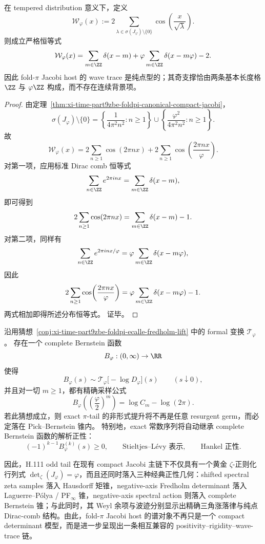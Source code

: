 \begin{proposition}\label{prop:xi-time-part9zbj-pure-point-poisson-jacobi-wave-trace}
在 tempered distribution 意义下，定义
\[
\mathcal W_\varphi(x)
:=
2\sum_{\lambda\in \sigma(J_\varphi)\setminus\{0\}}
\cos\!\left(\frac{x}{\sqrt\lambda}\right).
\]
则成立严格恒等式
\[
\mathcal W_\varphi(x)
=
\sum_{m\in\ZZ}\delta(x-m)
+
\varphi\sum_{m\in\ZZ}\delta(x-m\varphi)
-2.
\]
因此 fold-\(\pi\) Jacobi host 的 wave trace 是纯点型的；其奇支撑恰由两条基本长度格 \(\ZZ\) 与 \(\varphi\ZZ\) 构成，而不存在连续背景项。
\end{proposition}
\begin{proof}
由定理~\ref{thm:xi-time-part9zbe-foldpi-canonical-compact-jacobi}，
\[
\sigma(J_\varphi)\setminus\{0\}
=
\left\{\frac{1}{4\pi^2n^2}:n\ge 1\right\}
\cup
\left\{\frac{\varphi^2}{4\pi^2n^2}:n\ge 1\right\}.
\]
故
\[
\mathcal W_\varphi(x)
=
2\sum_{n\ge 1}\cos(2\pi n x)
+
2\sum_{n\ge 1}\cos\!\left(\frac{2\pi n x}{\varphi}\right).
\]
对第一项，应用标准 Dirac comb 恒等式
\[
\sum_{n\in\ZZ}e^{2\pi i n x}
=
\sum_{m\in\ZZ}\delta(x-m),
\]
即可得到
\[
2\sum_{n\ge 1}\cos(2\pi n x)
=
\sum_{m\in\ZZ}\delta(x-m)-1.
\]
对第二项，同样有
\[
\sum_{n\in\ZZ}e^{2\pi i n x/\varphi}
=
\varphi\sum_{m\in\ZZ}\delta(x-m\varphi),
\]
因此
\[
2\sum_{n\ge 1}\cos\!\left(\frac{2\pi n x}{\varphi}\right)
=
\varphi\sum_{m\in\ZZ}\delta(x-m\varphi)-1.
\]
两式相加即得所述分布恒等式。
证毕。
\end{proof}

\begin{conjecture}\label{conj:xi-time-part9zbj-complete-bernstein-ecalle-fredholm}
沿用猜想~\ref{conj:xi-time-part9zbe-foldpi-ecalle-fredholm-lift} 中的 formal 变换 \(\mathcal T_\varphi\)。
存在一个 complete Bernstein 函数
\[
B_\varphi:(0,\infty)\to \RR
\]
使得
\[
B_\varphi(s)\sim \mathcal T_\varphi\!\bigl[-\log D_\varphi\bigr](s)
\qquad (s\downarrow 0),
\]
并且对一切 \(m\ge 1\)，都有精确采样公式
\[
B_\varphi\!\left(\left(\frac{\varphi}{2}\right)^m\right)
=
\log C_m-\log(2\pi).
\]
若此猜想成立，则 exact \(\pi\)-tail 的非形式提升将不再是任意 resurgent germ，而必定落在 Pick--Bernstein 锥内。
特别地，exact 常数序列将自动继承 complete Bernstein 函数的解析正性：
\[
(-1)^{k-1}B_\varphi^{(k)}(s)\ge 0,
\qquad
\text{Stieltjes--L\'evy 表示},
\qquad
\text{Hankel 正性}.
\]
\end{conjecture}

\noindent
因此，H.111 odd tail 在现有 compact Jacobi 主链下不仅具有一个黄金 \(\zeta\)-正则化行列式 \(\det_\zeta(J_\varphi)=\varphi\)，而且还同时落入三种经典正性几何：shifted spectral zeta samples 落入 Hausdorff 矩锥，negative-axis Fredholm determinant 落入 Laguerre--P\'olya / PF\(_\infty\) 锥，negative-axis spectral action 则落入 complete Bernstein 锥；与此同时，其 Weyl 余项与波迹分别显示出精确三角涨落律与纯点 Dirac-comb 结构。由此，fold-\(\pi\) Jacobi host 的谱对象不再只是一个 compact determinant 模型，而是进一步呈现出一条相互兼容的 positivity--rigidity--wave-trace 链。

\endinput
